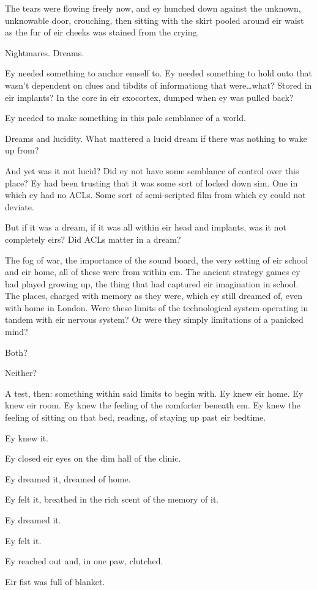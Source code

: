 The tears were flowing freely now, and ey hunched down against the unknown, unknowable door, crouching, then sitting with the skirt pooled around eir waist as the fur of eir cheeks was stained from the crying.

Nightmares. Dreams.

Ey needed something to anchor emself to. Ey needed something to hold onto that wasn't dependent on clues and tibdits of informationg that were\ldots{}what? Stored in eir implants? In the core in eir exocortex, dumped when ey was pulled back?

Ey needed to make something in this pale semblance of a world.

Dreams and lucidity. What mattered a lucid dream if there was nothing to wake up from?

And yet was it not lucid? Did ey not have some semblance of control over this place? Ey had been trusting that it was some sort of locked down sim. One in which ey had no ACLs. Some sort of semi-scripted film from which ey could not deviate.

But if it was a dream, if it was all within eir head and implants, was it not completely eirs? Did ACLs matter in a dream?

The fog of war, the importance of the sound board, the very setting of eir school and eir home, all of these were from within em. The ancient strategy games ey had played growing up, the thing that had captured eir imagination in school. The places, charged with memory as they were, which ey still dreamed of, even with home in London. Were these limits of the technological system operating in tandem with eir nervous system? Or were they simply limitations of a panicked mind?

Both?

Neither?

A test, then: something within said limits to begin with. Ey knew eir home. Ey knew eir room. Ey knew the feeling of the comforter beneath em. Ey knew the feeling of sitting on that bed, reading, of staying up past eir bedtime.

Ey knew it.

Ey closed eir eyes on the dim hall of the clinic.

Ey dreamed it, dreamed of home.

Ey felt it, breathed in the rich scent of the memory of it.

Ey dreamed it.

Ey felt it.

Ey reached out and, in one paw, clutched.

Eir fist was full of blanket.
